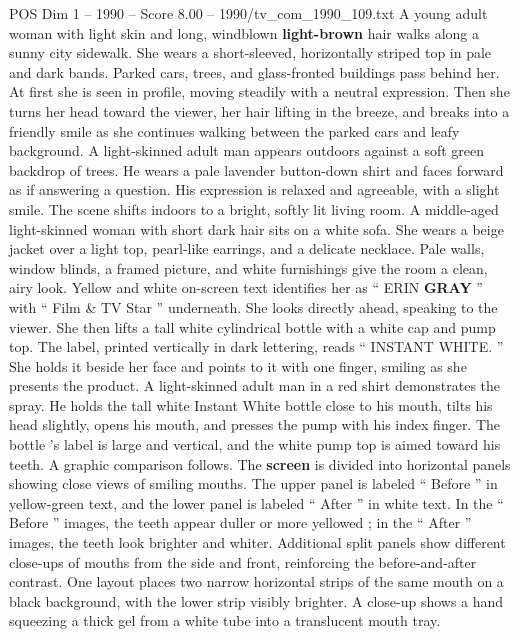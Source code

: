 \begin{textsample}{POS Dim 1 – 1990 – Score 8.00 – 1990/tv\_com\_1990\_109.txt}  \label{ex:f1_pos_048}
A young adult woman with light skin and long, windblown \textbf{light-brown} hair walks along a sunny city sidewalk.
She wears a short-sleeved, horizontally striped top in pale and dark bands.
Parked cars, trees, and glass-fronted buildings pass behind her.
At first she is seen in profile, moving steadily with a neutral expression.
Then she turns her head toward the viewer, her hair lifting in the breeze, and breaks into a friendly smile as she continues walking between the parked cars and leafy background.
A light-skinned adult man appears outdoors against a soft green backdrop of trees.
He wears a pale lavender button-down shirt and faces forward as if answering a question.
His expression is relaxed and agreeable, with a slight smile.
The scene shifts indoors to a bright, softly lit living room.
A middle-aged light-skinned woman with short dark hair sits on a white sofa.
She wears a beige jacket over a light top, pearl-like earrings, and a delicate necklace.
Pale walls, window blinds, a framed picture, and white furnishings give the room a clean, airy look.
Yellow and white on-screen text identifies her as “ ERIN \textbf{GRAY} ” with “ Film \& TV Star ” underneath.
She looks directly ahead, speaking to the viewer.
She then lifts a tall white cylindrical bottle with a white cap and pump top.
The label, printed vertically in dark lettering, reads “ INSTANT WHITE. ” She holds it beside her face and points to it with one finger, smiling as she presents the product.
A light-skinned adult man in a red shirt demonstrates the spray.
He holds the tall white Instant White bottle close to his mouth, tilts his head slightly, opens his mouth, and presses the pump with his index finger.
The bottle ’s label is large and vertical, and the white pump top is aimed toward his teeth.
A graphic comparison follows.
The \textbf{screen} is divided into horizontal panels showing close views of smiling mouths.
The upper panel is labeled “ Before ” in yellow-green text, and the lower panel is labeled “ After ” in white text.
In the “ Before ” images, the teeth appear duller or more yellowed ; in the “ After ” images, the teeth look brighter and whiter.
Additional split panels show different close-ups of mouths from the side and front, reinforcing the before-and-after contrast.
One layout places two narrow horizontal strips of the same mouth on a black background, with the lower strip visibly brighter.
A close-up shows a hand squeezing a thick gel from a white tube into a translucent mouth tray.

\end{textsample}
